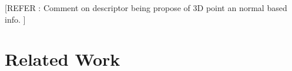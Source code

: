 \documentclass{bmvc2k}
\begin{document}
[REFER : Comment on descriptor being propose of 3D point an normal based info. ]


\section{Related Work}
\end{document}
